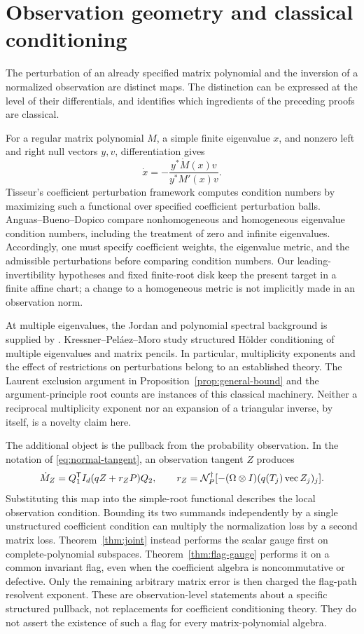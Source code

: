 \section{Observation geometry and classical conditioning}
\label{sec:conditioning-literature}
The perturbation of an already specified matrix polynomial and the
inversion of a normalized observation are distinct maps. The distinction
can be expressed at the level of their differentials, and identifies
which ingredients of the preceding proofs are classical.

For a regular matrix polynomial $M$, a simple finite eigenvalue $x$,
and nonzero left and right null vectors $y,v$, differentiation gives
\[
 \dot x=-\frac{y^*\dot M(x)v}{y^*M'(x)v}.
\]
Tisseur's coefficient perturbation framework \cite{Tisseur00} computes
condition numbers by maximizing such a functional over specified
coefficient perturbation balls. Anguas--Bueno--Dopico \cite{ABD19}
compare nonhomogeneous and homogeneous eigenvalue condition numbers,
including the treatment of zero and infinite eigenvalues. Accordingly,
one must specify coefficient weights, the eigenvalue metric, and the
admissible perturbations before comparing condition numbers. Our
leading-invertibility hypotheses and fixed finite-root disk keep the
present target in a finite affine chart; a change to a homogeneous
metric is not implicitly made in an observation norm.

At multiple eigenvalues, the Jordan and polynomial spectral background
is supplied by \cite{GLR82,MBO97}. Kressner--Pel\'aez--Moro \cite{KPM09}
study structured H\"older conditioning of multiple eigenvalues and
matrix pencils. In particular, multiplicity exponents and the effect
of restrictions on perturbations belong to an established theory.
The Laurent exclusion argument in Proposition~\ref{prop:general-bound}
and the argument-principle root counts are instances of this classical
machinery. Neither a reciprocal multiplicity exponent nor an expansion
of a triangular inverse, by itself, is a novelty claim here.

The additional object is the pullback from the probability observation.
In the notation of \eqref{eq:normal-tangent}, an observation tangent $Z$
produces
\[
 \dot M_Z=Q_1^{\mathsf T}I_d(qZ+r_ZP)Q_2,
 \qquad
 r_Z=\mathcal N_P^\dagger[-(\Omega\otimes I)(q(T_j)\operatorname{vec}Z_j)_j].
\]
Substituting this map into the simple-root functional describes the
local observation condition. Bounding its two summands independently
by a single unstructured coefficient condition can multiply the
normalization loss by a second matrix loss. Theorem~\ref{thm:joint}
instead performs the scalar gauge first on complete-polynomial
subspaces. Theorem~\ref{thm:flag-gauge} performs it on a common invariant
flag, even when the coefficient algebra is noncommutative or defective.
Only the remaining arbitrary matrix error is then charged the flag-path
resolvent exponent. These are observation-level statements about a
specific structured pullback, not replacements for coefficient
conditioning theory. They do not assert the existence of such a flag
for every matrix-polynomial algebra.

